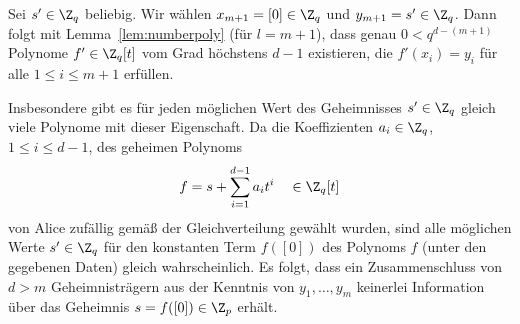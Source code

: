 Sei $s' \in \Z_q$ beliebig. Wir wählen $x_{m+1} = [0] \in \Z_q$ und $y_{m+1} = s' \in \Z_q$. Dann folgt mit Lemma~\ref{lem:numberpoly} (für $l = m+1$), dass genau $0 < q^{d - (m+1)}$ Polynome $f' \in \Z_q[t]$ vom Grad höchstens $d - 1$ existieren, die $f'(x_i) = y_i$ für alle $1 \leq i \leq m+1$ erfüllen.  

Insbesondere gibt es für jeden möglichen Wert des Geheimnisses $s' \in \Z_q$ gleich viele Polynome mit dieser Eigenschaft. Da die Koeffizienten $a_i \in \Z_q$, $1 \leq i \leq d - 1$, des geheimen Polynoms 
\[f = s + \sum_{i=1}^{d-1} a_i t^i \quad \in \Z_q[t]\]
von Alice zufällig gemäß der Gleichverteilung gewählt wurden, sind alle möglichen Werte $s' \in \Z_q$ für den konstanten Term $f([0])$ des Polynoms $f$ (unter den gegebenen Daten) gleich wahrscheinlich. Es folgt, dass ein Zusammenschluss von $d > m$ Geheimnisträgern aus der Kenntnis von $y_1, \dots, y_m$ keinerlei Information über das Geheimnis $s = f([0]) \in \Z_p$ erhält.


 

% 

